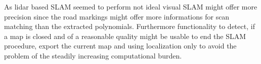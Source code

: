 As lidar based SLAM seemed to perform not ideal visual SLAM might offer more precision since the road markings might offer more informations for scan matching than the extracted polynomials. Furthermore functionality to detect, if a map is closed and of a reasonable quality might be usable to end the SLAM procedure, export the current map and using localization only to avoid the problem of the steadily increasing computational burden.